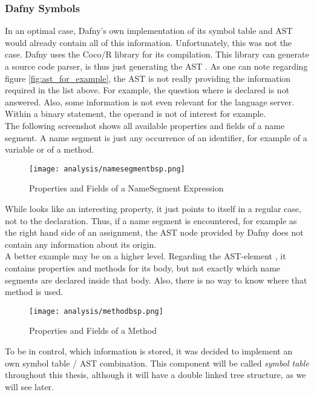\subsubsection{Dafny Symbols}
In an optimal case, Dafny's own implementation of its symbol table and AST would already contain all of this information.
Unfortunately, this was not the case.
Dafny uses the Coco/R library for its compilation.
This library can generate a source code parser, is thus just generating the AST \cite{coco}.
As one can note regarding figure \ref{fig:ast_for_example}, the AST is not really providing the information required in the list above.
For example, the question where  is declared is not answered.
Also, some information is not even relevant for the language server.
Within a binary statement, the operand is not of interest for example.\\

The following screenshot shows all available properties and fields of a name segment.
A name segment is just any occurrence of an identifier, for example of a variable or of a method.
\begin{figure}[H]
    \centering
    \texttt{[image: analysis/namesegmentbsp.png]}
    \caption{Properties and Fields of a NameSegment Expression}
    \label{fig:namesegment}
\end{figure}
While  looks like an interesting property, it just points to itself in a regular case, not to the declaration.
Thus, if a name segment is encountered, for example as the right hand side of an assignment, the AST node provided by Dafny does not contain any information about its origin.\\

A better example may be on a higher level.
Regarding the AST-element ,
it contains properties and methods for its body, but not exactly which name segments are declared inside that body.
Also, there is no way to know where that method is used.

\begin{figure}[H]
    \centering
    \texttt{[image: analysis/methodbsp.png]}
    \caption{Properties and Fields of a Method}
    \label{fig:method}
\end{figure}

To be in control, which information is stored, it was decided to implement an own symbol table / AST combination.
This component will be called \textit{symbol table} throughout this thesis, although it will have a double linked tree structure, as we will see later.


